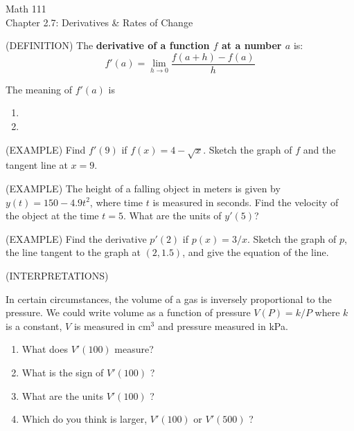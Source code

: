 \documentclass[11pt]{article}
\begin{document}
\begin{center}
\Large
\rm{Math 111}
\\
\rm{Chapter 2.7:  Derivatives \& Rates of Change}
\\
\end{center}
\vspace{0.2in}

(DEFINITION) The {\bf derivative of a function $f$ at a number $a$} is:
\begin{displaymath}
f'(a) = \lim_{h\to 0} \frac{f(a+h)-f(a)}{h}
  \end{displaymath}


\vspace{0.5in}

The meaning of $f'(a)$ is
\begin{enumerate}
\item{}
  \vspace{0.2in}
\item{}
  \vspace{0.2in}
  
  \end{enumerate}

  \vspace{0.2in}

(EXAMPLE)  Find $f'(9)$ if $f(x) = 4-\sqrt{x}$.  Sketch the graph of $f$ and the tangent line at $x=9$.


\pagebreak


(EXAMPLE)  The height of a falling object in meters is given by $y(t) = 150 - 4.9t^2$, where time $t$ is measured
in seconds.  Find the velocity of the object at the time $t=5$.  What are the units of $y'(5)$?


\vspace{3.5in}


(EXAMPLE)  Find the derivative $p'(2)$ if $p(x) = 3/x$.  Sketch the graph of $p$, the line tangent to the
graph at $(2, 1.5)$, and give the equation of the line.


\pagebreak

(INTERPRETATIONS)\\

\vspace{0.1in}

In certain circumstances, the volume of a gas is inversely proportional to the pressure.  We could write
volume as a function of pressure $V(P) = k/P$ where $k$ is a constant, $V$ is measured in cm$^3$ and pressure measured
in kPa.
\begin{enumerate}
\item{What does $V'(100)$ measure?}
\item{What is the sign of $V'(100)$ ?}
\item{What are the units $V'(100)$ ?}
\item{Which do you think is larger, $V'(100)$ or $V'(500)$ ?}
\end{enumerate}
\end{document}

